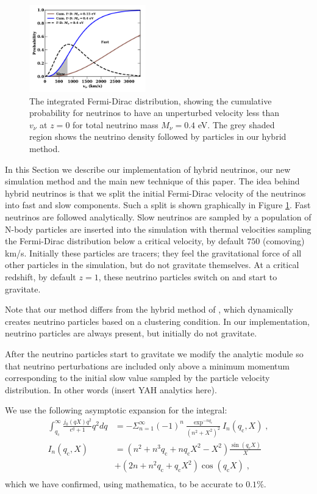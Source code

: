 \documentclass[useAMS, usenatbib]{mnras}
\begin{document}
\begin{figure}
\includegraphics[width=0.45\textwidth]{nuplots/fermidirac.pdf}
  \caption{The integrated Fermi-Dirac distribution, showing the cumulative probability for neutrinos to have an unperturbed velocity less than $v_\nu$ at $z=0$ for total neutrino mass $M_\nu = 0.4$ eV.
  The grey shaded region shows the neutrino density followed by particles in our hybrid method.
  }
  \label{fig:fddistribution}
\end{figure}

In this Section we describe our implementation of hybrid neutrinos, our new simulation method and the main new technique of this paper. The idea behind hybrid neutrinos is that we split the initial Fermi-Dirac velocity of the neutrinos into fast and slow components. Such a split is shown graphically in Figure \ref{fig:fddistribution}. Fast neutrinos are followed analytically. Slow neutrinos are sampled by a population of N-body particles are inserted into the simulation with thermal velocities sampling the Fermi-Dirac distribution below a critical velocity, by default $750$ (comoving) km/s. Initially these particles are tracers; they feel the gravitational force of all other particles in the simulation, but do not gravitate themselves. At a critical redshift, by default $z=1$, these neutrino particles switch on and start to gravitate.

Note that our method differs from the hybrid method of \cite{Brandbyge_2010}, which dynamically creates neutrino particles based on a clustering condition. In our implementation, neutrino particles are always present, but initially do not gravitate.

After the neutrino particles start to gravitate we modify the
analytic module so that neutrino perturbations are included only above a
minimum momentum corresponding to the initial slow value sampled by the
particle velocity distribution. In other words (insert YAH analytics here).

We use the following asymptotic expansion for the integral:
\begin{align}
 \int^\infty_{q_\mathrm{c}} \frac{j_0(qX) q^2}{e^q + 1} q^2 dq &= - \Sigma^{\infty}_{n=1} (-1)^n \frac{\exp^{-n q_\mathrm{c}}}{(n^2+X^2)^2} I_n(q_\mathrm{c},X) \;,\\
 I_n(q_\mathrm{c},X) &= (n^2 + n^3 q_\mathrm{c} + n q_\mathrm{c} X^2 - X^2) \frac{\sin(q_\mathrm{c} X)}{X} \\
 &+ (2n + n^2 q_\mathrm{c} + q_\mathrm{c} X^2) \cos(q_\mathrm{c} X)\;,\\
\end{align}
which we have confirmed, using mathematica, to be accurate to $0.1\%$.
\end{document}
